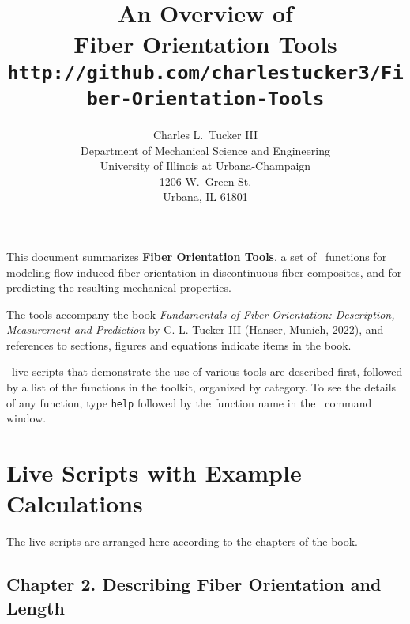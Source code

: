 \documentclass[11pt]{article}
\title{An Overview of \\
      \textbf{Fiber Orientation Tools} \\
      { \normalsize \texttt{http://github.com/charlestucker3/Fiber-Orientation-Tools}} }
\author{Charles L.~Tucker III \\
       Department of Mechanical Science and Engineering \\
        University of Illinois at Urbana-Champaign \\
        1206 W.~Green St. \\
        Urbana, IL 61801 \\
        }
\begin{document}
\maketitle

This document summarizes \textbf{Fiber Orientation Tools}, a set of \matlab\ functions for modeling flow-induced fiber orientation in discontinuous fiber composites, and for predicting the resulting mechanical properties.  

The tools accompany the book \textit{Fundamentals of Fiber Orientation: Description, Measurement and Prediction} by C. L. Tucker III (Hanser, Munich, 2022), and references to sections, figures and equations indicate items in the book.  

 \matlab\ live scripts that demonstrate the use of various tools are described first, followed by a list of the functions in the toolkit, organized by category.  To see the details of any function, type \texttt{help} followed by the function name in the \matlab\ command window.



\section{Live Scripts with Example Calculations}

The live scripts are arranged here according to the chapters of the book.  

\subsection*{Chapter 2.  Describing Fiber Orientation and Length}
\end{document}
